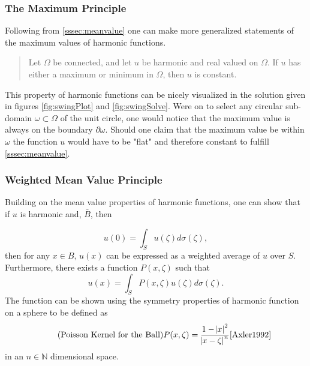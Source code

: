   \subsubsection{The Maximum Principle}\label{sssec:maximum}
  Following from \ref{sssec:meanvalue} one can make more generalized statements of
  the maximum values of harmonic functions.
  \begin{quote}
      Let $\Omega$ be connected, and let $u$ be harmonic and real valued on $\Omega$.
      If $u$ has either a maximum or minimum in $\Omega$, then $u$ is constant.\cite{Axler1992}
  \end{quote}

  This property of harmonic functions can be nicely visualized in the solution given
  in figures \ref{fig:swingPlot} and \ref{fig:swingSolve}. Were on to select any circular
  sub-domain $\omega \subset \Omega$ of the unit circle, one would notice that the maximum value is always
  on the boundary  $\partial \omega$.  Should one claim that the maximum  value be within $\omega$
  the function $u$ would have to be "flat" and therefore constant to fulfill \ref{sssec:meanvalue}.

  \subsubsection{Weighted Mean Value Principle}%
  Building on the mean value properties of harmonic functions, one can show that if $u$ is harmonic and,
  $\bar{B}$, then

   $$u(0) = \int_{S}u(\zeta)d\sigma(\zeta),$$
  then for any $x \in B\text{, }u(x)$ can be expressed as a weighted average of
  $u$ over $S$. Furthermore, there exists a function $P(x,\zeta)$ such that
  $$u(x)=\int_{S}P(x,\zeta)u(\zeta)d\sigma(\zeta).$$  The function can be shown
  using the symmetry properties of harmonic function on a sphere to be defined as
  \begin{equation}
    \tag{Poisson Kernel for the Ball}
    P(x,\zeta) = \frac{1 - \abs{x}^{2}}{\abs{x- \zeta}^{n}}
    \label{eq:poissonkernel}
    \cite{Axler1992}
  \end{equation}
  in an $n \in \mathbb{N}$ dimensional space.

